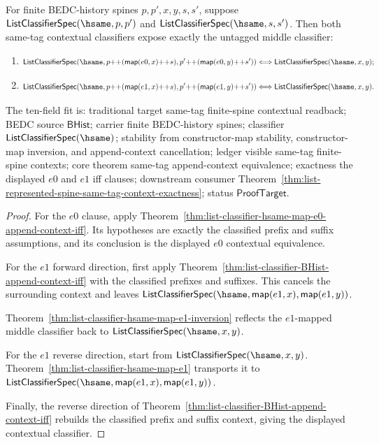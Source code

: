 \begin{theorem}
\label{thm:list-classifier-same-tag-append-context-equivalence}
For finite BEDC-history spines $p,p',x,y,s,s'$, suppose
$\mathsf{ListClassifierSpec}(\hsame,p,p')$ and
$\mathsf{ListClassifierSpec}(\hsame,s,s')$. Then both same-tag contextual
classifiers expose exactly the untagged middle classifier:
\begin{enumerate}
  \item
  $$
  \mathsf{ListClassifierSpec}(\hsame,
    p{++}(\mathsf{map}(e0,x){++}s),
    p'{++}(\mathsf{map}(e0,y){++}s'))
  \Longleftrightarrow
  \mathsf{ListClassifierSpec}(\hsame,x,y);
  $$
  \item
  $$
  \mathsf{ListClassifierSpec}(\hsame,
    p{++}(\mathsf{map}(e1,x){++}s),
    p'{++}(\mathsf{map}(e1,y){++}s'))
  \Longleftrightarrow
  \mathsf{ListClassifierSpec}(\hsame,x,y).
  $$
\end{enumerate}

The ten-field fit is: traditional target same-tag finite-spine contextual
readback; BEDC source $\mathsf{BHist}$; carrier finite BEDC-history spines;
classifier $\mathsf{ListClassifierSpec}(\hsame)$; stability from
constructor-map stability, constructor-map inversion, and append-context
cancellation; ledger visible same-tag finite-spine contexts; core theorem
same-tag append-context equivalence; exactness the displayed $e0$ and $e1$
iff clauses; downstream consumer
Theorem~\ref{thm:list-represented-spine-same-tag-context-exactness}; status
$\mathsf{ProofTarget}$.
\end{theorem}
\begin{proof}
For the $e0$ clause, apply
Theorem~\ref{thm:list-classifier-hsame-map-e0-append-context-iff}. Its
hypotheses are exactly the classified prefix and suffix assumptions, and its
conclusion is the displayed $e0$ contextual equivalence.

For the $e1$ forward direction, first apply
Theorem~\ref{thm:list-classifier-BHist-append-context-iff} with the classified
prefixes and suffixes. This cancels the surrounding context and leaves
$\mathsf{ListClassifierSpec}(\hsame,\mathsf{map}(e1,x),\mathsf{map}(e1,y))$.

Theorem~\ref{thm:list-classifier-hsame-map-e1-inversion} reflects the
$e1$-mapped middle classifier back to
$\mathsf{ListClassifierSpec}(\hsame,x,y)$.

For the $e1$ reverse direction, start from
$\mathsf{ListClassifierSpec}(\hsame,x,y)$. Theorem~\ref{thm:list-classifier-hsame-map-e1}
transports it to
$\mathsf{ListClassifierSpec}(\hsame,\mathsf{map}(e1,x),\mathsf{map}(e1,y))$.

Finally, the reverse direction of
Theorem~\ref{thm:list-classifier-BHist-append-context-iff} rebuilds the
classified prefix and suffix context, giving the displayed contextual
classifier.
\end{proof}

